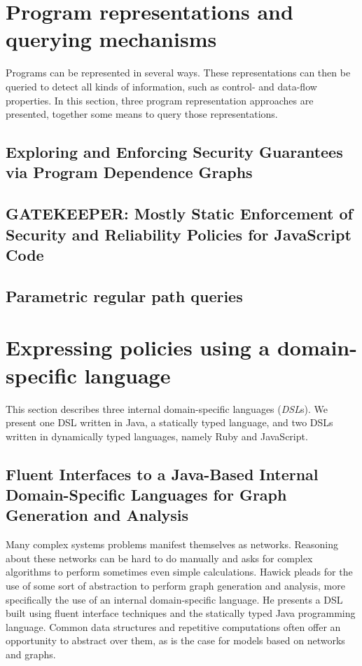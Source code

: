 \section{Program representations and querying mechanisms} %

Programs can be represented in several ways. These representations can then be queried to detect all kinds of information, such as control- and data-flow properties. In this section, three program representation approaches are presented, together some means to query those representations.

\subsection{Exploring and Enforcing Security Guarantees via Program Dependence Graphs}

\subsection{GATEKEEPER: Mostly Static Enforcement of Security and Reliability Policies for JavaScript Code}

\subsection{Parametric regular path queries}

\section{Expressing policies using a domain-specific language} %

This section describes three internal domain-specific languages (\textit{DSL}s). We present one DSL written in Java, a statically typed language, and two DSLs written in dynamically typed languages, namely Ruby and JavaScript.

\subsection{Fluent Interfaces to a Java-Based Internal Domain-Specific Languages for Graph Generation and Analysis}
Many complex systems problems manifest themselves as networks. Reasoning about these networks can be hard to do manually and asks for complex algorithms to perform sometimes even simple calculations. Hawick\cite{FluentInterfacesJava} pleads for the use of some sort of abstraction to perform graph generation and analysis, more specifically the use of an internal domain-specific language. He presents a DSL built using fluent interface techniques and the statically typed Java programming language. Common data structures and repetitive computations often offer an opportunity to abstract over them, as is the case for models based on networks and graphs.

